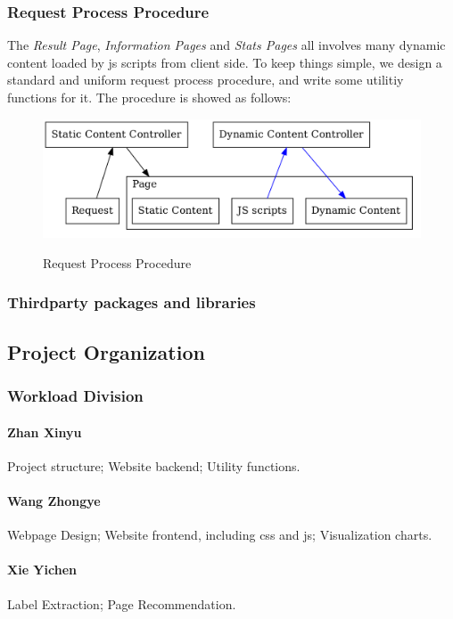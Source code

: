 \documentclass[a4paper, 10pt]{article}
\begin{document}
\subsubsection{Request Process Procedure}
The \textit{Result Page}, \textit{Information Pages} and \textit{Stats Pages} all involves many dynamic content loaded by js scripts from client side. To keep things simple, we design a standard and uniform request process procedure, and write some utilitiy functions for it.
The procedure is showed as follows:
\begin{figure}[H]
  \centering
  \caption{Request Process Procedure}
  \includegraphics[width=\textwidth]{r_p_p.png}
  \label{fig:r_p_p}
\end{figure}

\subsubsection{Thirdparty packages and libraries}
\subsection{Project Organization}
\subsubsection{Workload Division}
\paragraph{Zhan Xinyu} Project structure; Website backend; Utility functions.
\paragraph{Wang Zhongye} Webpage Design; Website frontend, including css and js; Visualization charts.
\paragraph{Xie Yichen} Label Extraction; Page Recommendation. 
\end{document}
